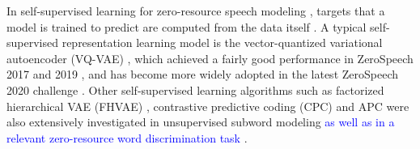 \documentclass[transmag]{IEEEtran}
\begin{document}
In self-supervised learning for zero-resource speech modeling \cite{oord2017neural,hsu2017nips,oord2018cpc,Pascual2019,Chung2019,badino2014auto}, targets that a model is trained to predict are computed from the data itself \cite{doersch2017multi}. A typical self-supervised representation learning model is the vector-quantized variational autoencoder (VQ-VAE) \cite{oord2017neural}, which 
achieved a fairly good performance in ZeroSpeech 2017 \cite{chorowski2019unsupervised} and 2019 \cite{Tjandra2019}, and has become more widely adopted  \cite{Niekerk2020,Tobing2020Cyclic,Tjandra2020transformer} in the latest ZeroSpeech 2020 challenge \cite{Dunbar2020zero}.
Other self-supervised learning algorithms such as factorized hierarchical VAE  (FHVAE) \cite{Hsu2018extracting}, contrastive predictive coding (CPC) \cite{oord2018cpc} and APC \cite{Chung2019} were also extensively investigated in unsupervised subword modeling \cite{Feng2019improving,riviere2020unsupervised,feng2020unsupervised,Niekerk2020} \textcolor{blue}{ as well as in a relevant zero-resource word discrimination task \cite{vanStaden2021comparison}}.

\end{document}
